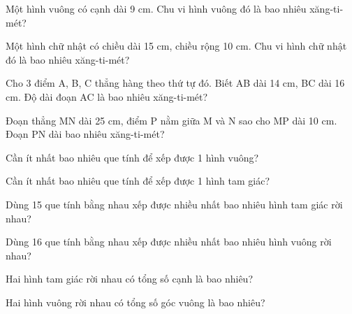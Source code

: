 \begin{ex}
Một hình vuông có cạnh dài 9 cm. Chu vi hình vuông đó là bao nhiêu xăng-ti-mét?
\end{ex}

\begin{ex}
Một hình chữ nhật có chiều dài 15 cm, chiều rộng 10 cm. Chu vi hình chữ nhật đó là bao nhiêu xăng-ti-mét?
\end{ex}

\begin{ex}
Cho 3 điểm A, B, C thẳng hàng theo thứ tự đó. Biết AB dài 14 cm, BC dài 16 cm. Độ dài đoạn AC là bao nhiêu xăng-ti-mét?
\end{ex}

\begin{ex}
Đoạn thẳng MN dài 25 cm, điểm P nằm giữa M và N sao cho MP dài 10 cm. Đoạn PN dài bao nhiêu xăng-ti-mét?
\end{ex}

\begin{ex}
Cần ít nhất bao nhiêu que tính để xếp được 1 hình vuông?
\end{ex}

\begin{ex}
Cần ít nhất bao nhiêu que tính để xếp được 1 hình tam giác?
\end{ex}

\begin{ex}
Dùng 15 que tính bằng nhau xếp được nhiều nhất bao nhiêu hình tam giác rời nhau?
\end{ex}

\begin{ex}
Dùng 16 que tính bằng nhau xếp được nhiều nhất bao nhiêu hình vuông rời nhau?
\end{ex}

\begin{ex}
Hai hình tam giác rời nhau có tổng số cạnh là bao nhiêu?
\end{ex}

\begin{ex}
Hai hình vuông rời nhau có tổng số góc vuông là bao nhiêu?
\end{ex}

